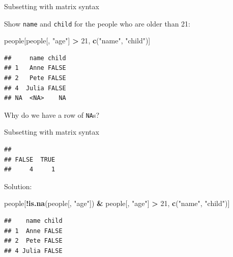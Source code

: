 \documentclass[ignorenonframetext,]{beamer}
\newenvironment{Shaded}{\begin{snugshade}}{\end{snugshade}}
\newcommand{\DecValTok}[1]{\textcolor[rgb]{0.00,0.00,0.81}{#1}}
\newcommand{\KeywordTok}[1]{\textcolor[rgb]{0.13,0.29,0.53}{\textbf{#1}}}
\newcommand{\NormalTok}[1]{#1}
\newcommand{\OperatorTok}[1]{\textcolor[rgb]{0.81,0.36,0.00}{\textbf{#1}}}
\newcommand{\StringTok}[1]{\textcolor[rgb]{0.31,0.60,0.02}{#1}}
\begin{document}
\begin{frame}[fragile]{Subsetting with matrix syntax}
\protect\hypertarget{subsetting-with-matrix-syntax-9}{}

Show \texttt{name} and \texttt{child} for the people who are older than
21:

\begin{Shaded}
\begin{Highlighting}[]
\NormalTok{people[people[, }\StringTok{"age"}\NormalTok{] }\OperatorTok{>}\StringTok{ }\DecValTok{21}\NormalTok{, }\KeywordTok{c}\NormalTok{(}\StringTok{"name"}\NormalTok{, }\StringTok{"child"}\NormalTok{)]}
\end{Highlighting}
\end{Shaded}

\begin{verbatim}
##     name child
## 1   Anne FALSE
## 2   Pete FALSE
## 4  Julia FALSE
## NA  <NA>    NA
\end{verbatim}

Why do we have a row of \texttt{NA}s?

\end{frame}

\begin{frame}[fragile]{Subsetting with matrix syntax}
\protect\hypertarget{subsetting-with-matrix-syntax-10}{}

\begin{Shaded}
\end{Shaded}

\begin{verbatim}
## 
## FALSE  TRUE 
##     4     1
\end{verbatim}

Solution:

\begin{Shaded}
\begin{Highlighting}[]
\NormalTok{people[}\OperatorTok{!}\KeywordTok{is.na}\NormalTok{(people[, }\StringTok{"age"}\NormalTok{]) }\OperatorTok{&}\StringTok{ }\NormalTok{people[, }\StringTok{"age"}\NormalTok{] }\OperatorTok{>}\StringTok{ }\DecValTok{21}\NormalTok{,}
       \KeywordTok{c}\NormalTok{(}\StringTok{"name"}\NormalTok{, }\StringTok{"child"}\NormalTok{)]}
\end{Highlighting}
\end{Shaded}

\begin{verbatim}
##    name child
## 1  Anne FALSE
## 2  Pete FALSE
## 4 Julia FALSE
\end{verbatim}

\end{frame}
\end{document}
